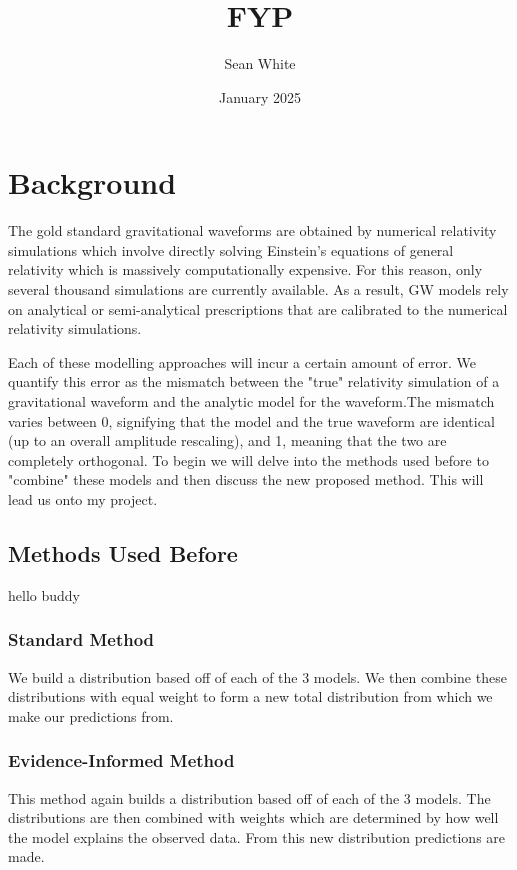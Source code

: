\documentclass{article}
\title{FYP }
\author{Sean White}
\date{January 2025}
\begin{document}
\maketitle

\section{Background}

The gold standard gravitational waveforms are obtained by numerical relativity simulations which involve directly solving Einstein's equations of general relativity which is massively computationally expensive. For this reason, only several thousand simulations are currently available. As a result, GW models rely on analytical or semi-analytical prescriptions that are calibrated to the numerical relativity simulations.

\par
\noindent
Each of these modelling approaches will incur a certain amount of error. We quantify this error as the mismatch between the "true" relativity simulation of a gravitational waveform and the analytic model for the waveform.The mismatch \cite{owen1995template} varies between 0, signifying that the model and the true waveform are identical (up to an overall amplitude rescaling), and 1, meaning that the two are completely orthogonal. To begin we will delve into the methods used before to "combine" these models and then discuss the new proposed method. This will lead us onto my project.



\subsection*{Methods Used Before}
hello buddy

\subsubsection*{Standard Method}
We build a distribution based off of each of the 3 models. We then combine these distributions with equal weight to form a new total distribution from which we make our predictions from.

\subsubsection*{Evidence-Informed Method}
This method again builds a distribution based off of each of the 3 models. The distributions are then combined with weights which are determined by how well the model explains the observed data. From this new distribution predictions are made.
\end{document}
